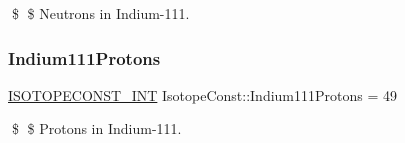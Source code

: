 \$ \$ Neutrons in Indium-\/111. \mbox{\label{group___isotope_const-_indium-_in111_ga18f1025b7e044a92ebd0d21c7ad6f178}} 
\subsubsection{\texorpdfstring{Indium111\+Protons}{Indium111Protons}}
{\footnotesize\ttfamily \mbox{\hyperlink{group___isotope_const-_macros_ga5f18360b3e99483a35c32d789e62621c}{I\+S\+O\+T\+O\+P\+E\+C\+O\+N\+S\+T\+\_\+\+I\+NT}} Isotope\+Const\+::\+Indium111\+Protons = 49}

\$ \$ Protons in Indium-\/111. 